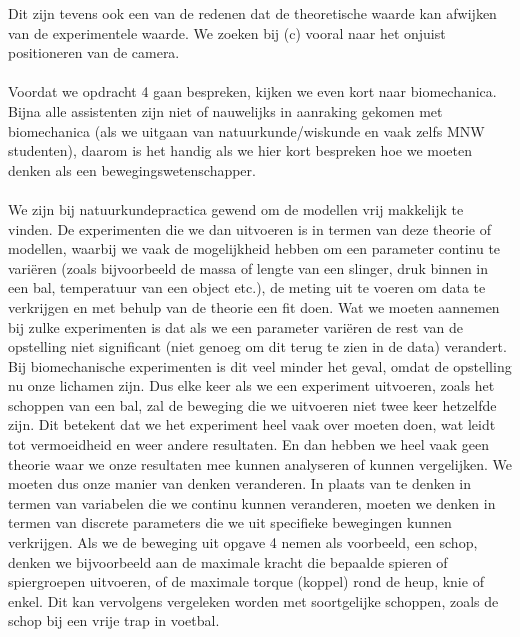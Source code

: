 \documentclass{article}
\begin{document}
Dit zijn tevens ook een van de redenen dat de theoretische waarde kan afwijken van de experimentele waarde. We zoeken bij (c) vooral naar het onjuist positioneren van de camera. \\\\ Voordat we opdracht 4 gaan bespreken, kijken we even kort naar biomechanica. Bijna alle assistenten zijn niet of nauwelijks in aanraking gekomen met biomechanica (als we uitgaan van natuurkunde/wiskunde en vaak zelfs MNW studenten), daarom is het handig als we hier kort bespreken hoe we moeten denken als een bewegingswetenschapper. \\\\ We zijn bij natuurkundepractica gewend om de modellen vrij makkelijk te vinden. De experimenten die we dan uitvoeren is in termen van deze theorie of modellen, waarbij we vaak de mogelijkheid hebben om een parameter continu te variëren (zoals bijvoorbeeld de massa of lengte van een slinger, druk binnen in een bal, temperatuur van een object etc.), de meting uit te voeren om data te verkrijgen en met behulp van de theorie een fit doen. Wat we moeten aannemen bij zulke experimenten is dat als we een parameter variëren de rest van de opstelling niet significant (niet genoeg om dit terug te zien in de data) verandert. Bij biomechanische experimenten is dit veel minder het geval, omdat de opstelling nu onze lichamen zijn. Dus elke keer als we een experiment uitvoeren, zoals het schoppen van een bal, zal de beweging die we uitvoeren niet twee keer hetzelfde zijn. Dit betekent dat we het experiment heel vaak over moeten doen, wat leidt tot vermoeidheid en weer andere resultaten. En dan hebben we heel vaak geen theorie waar we onze resultaten mee kunnen analyseren of kunnen vergelijken. We moeten dus onze manier van denken veranderen. In plaats van te denken in termen van variabelen die we continu kunnen veranderen, moeten we denken in termen van discrete parameters die we uit specifieke bewegingen kunnen verkrijgen. Als we de beweging uit opgave 4 nemen als voorbeeld, een schop, denken we bijvoorbeeld aan de maximale kracht die bepaalde spieren of spiergroepen uitvoeren, of de maximale torque (koppel) rond de heup, knie of enkel. Dit kan vervolgens vergeleken worden met soortgelijke schoppen, zoals de schop bij een vrije trap in voetbal. 
\end{document}
